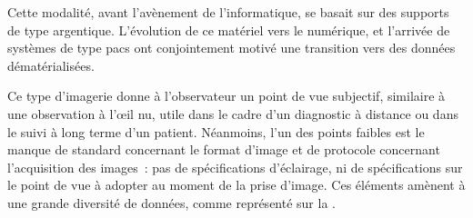 Cette modalité, avant l’avènement de l’informatique, se basait sur des supports de type argentique. L’évolution de ce matériel vers le numérique, et l’arrivée de systèmes de type \gls{pacs} ont conjointement motivé une transition vers des données dématérialisées.\par

Ce type d’imagerie donne à l’observateur un point de vue subjectif, similaire à une observation à l’œil nu, utile dans le cadre d’un diagnostic à distance ou dans le suivi à long terme d’un patient. Néanmoins, l'un des points faibles est le manque de standard concernant le format d'image et de protocole concernant l'acquisition des images~: pas de spécifications d'éclairage, ni de spécifications sur le point de vue à adopter au moment de la prise d'image. Ces éléments amènent à une grande diversité de données, comme représenté sur la .\par

